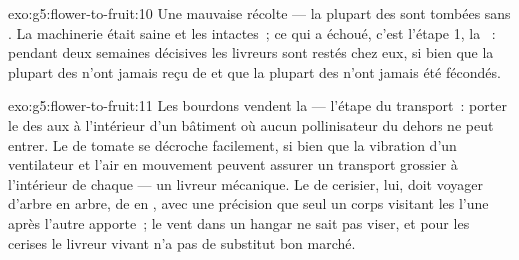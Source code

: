 \begin{solution}{exo:g5:flower-to-fruit:10}
Une mauvaise récolte --- la plupart des  sont tombées sans
. La machinerie était saine et les  intactes~; ce qui a
échoué, c'est l'étape 1, la ~: pendant deux semaines
décisives les livreurs sont restés chez eux, si bien que la plupart
des  n'ont jamais reçu de  et que la plupart des 
n'ont jamais été fécondés.
\end{solution}

\begin{solution}{exo:g5:flower-to-fruit:11}
Les bourdons vendent la  --- l'étape du transport~:
porter le  des  aux  à l'intérieur d'un
bâtiment où aucun pollinisateur du dehors ne peut entrer. Le 
de tomate se décroche facilement, si bien que la vibration d'un
ventilateur et l'air en mouvement peuvent assurer un transport
grossier à l'intérieur de chaque  --- un livreur mécanique. Le
 de cerisier, lui, doit voyager d'arbre en arbre, de  en
, avec une précision que seul un corps visitant les 
l'une après l'autre apporte~; le vent dans un hangar ne sait pas
viser, et pour les cerises le livreur vivant n'a pas de substitut
bon marché.
\end{solution}
